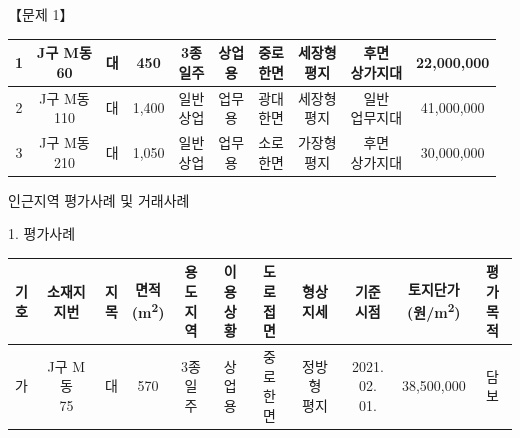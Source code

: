 \begin{longquestion}{【문제 1】}
{\begin{tabular}{|c|c|c|c|c|c|c|c|c|c|}
1 & \makecell{J구 M동\\60} & 대 & 450 & \makecell{3종\\일주} & \makecell{상업\\용} & \makecell{중로\\한면} & \makecell{세장형\\평지} & \makecell{후면\\상가지대} & 22,000,000 \\\hline
2 & \makecell{J구 M동\\110} & 대 & 1,400 & \makecell{일반\\상업} & \makecell{업무\\용} & \makecell{광대\\한면} & \makecell{세장형\\평지} & \makecell{일반\\업무지대} & 41,000,000 \\\hline
3 & \makecell{J구 M동\\210} & 대 & 1,050 & \makecell{일반\\상업} & \makecell{업무\\용} & \makecell{소로\\한면} & \makecell{가장형\\평지} & \makecell{후면\\상가지대} & 30,000,000 \\\hline
\end{tabular}\par}
\medskip{} 인근지역 평가사례 및 거래사례 \par
1. 평가사례 \par
{\small\centering
\begin{tabular}{|c|c|c|c|c|c|c|c|c|c|c|}\hline
\makecell{기\\호} & \makecell{소재지\\지번} & \makecell{지\\목} & \makecell{면적\\(m\textsuperscript{2})} & \makecell{용도\\지역} & \makecell{이용\\상황} & \makecell{도로\\접면} & \makecell{형상\\지세} & \makecell{기준\\시점} & \makecell{토지단가\\(원/m\textsuperscript{2})} & \makecell{평가\\목적} \\\hline
가 & \makecell{J구 M동\\75} & 대 & 570 & \makecell{3종\\일주} & \makecell{상업\\용} & \makecell{중로\\한면} & \makecell{정방형\\평지} & \makecell{2021.\\02. 01.} & 38,500,000 & 담보 \\\hline

\end{tabular}}
\end{longquestion}
